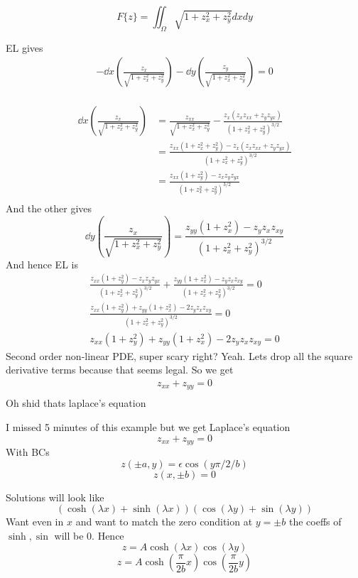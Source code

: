 \documentclass{X:/Documents/Coding/Latex/myassignment}
\begin{document}
\[F\{z\} = \iint_{\Omega} \sqrt{1+ z_x^2 + z_y^2} dxdy\]

EL gives
\begin{align*}
	- \dd{}x \left(\frac{z_x}{\sqrt{1 + z_x^2 + z_y^2}}\right) - \dd{}y \left(\frac{z_y}{\sqrt{1+z_x^2+z_y^2}}\right)=0\\
\end{align*}

\begin{align*}
	\dd{}x \left(\frac{z_x}{\sqrt{1+z_x^2+z_y^2}}\right) &= \frac{z_{xx}}{\sqrt{1+z_x^2+z_y^2}} - \frac{z_x(z_x z_{xx} + z_y z_{yx})}{(1 + z_x^2 + z_y^2)^{3/2}}\\
	&=\frac{z_{xx} (1+z_x^2 + z_y^2) - z_x(z_x z_{xx} + z_y z_{yx})}{(1 + z_x^2 + z_y^2)^{3/2}}\\
	&= \frac{z_{xx} (1+ z_y^2) - z_x z_y z_{yx}}{(1 + z_x^2 + z_y^2)^{3/2}}\\
\end{align*}
And the other gives
\[\dd{}y \left(\frac{z_x}{\sqrt{1+z_x^2+z_y^2}}\right) = \frac{z_{yy} (1+ z_x^2) - z_y z_x z_{xy}}{(1 + z_x^2 + z_y^2)^{3/2}}\]
And hence
EL is
\begin{align*}
	\frac{z_{xx} (1+ z_y^2) - z_x z_y z_{yx}}{(1 + z_x^2 + z_y^2)^{3/2}} + \frac{z_{yy} (1+ z_x^2) - z_y z_x z_{xy}}{(1 + z_x^2 + z_y^2)^{3/2}} = 0\\
	\frac{z_{xx} (1+ z_y^2) + z_{yy} (1+ z_x^2) - 2z_y z_x z_{xy}}{(1 + z_x^2 + z_y^2)^{3/2}} = 0\\
	z_{xx} (1+ z_y^2) + z_{yy} (1+ z_x^2) - 2z_y z_x z_{xy} = 0
\end{align*}
Second order non-linear PDE, super scary right? Yeah. Lets drop all the square derivative terms because that seems legal.
So we get
\begin{align*}
	z_{xx} + z_{yy} = 0\\
\end{align*}
Oh shid thats laplace's equation



I missed 5 minutes of this example but we get Laplace's equation 
\[z_{xx} + z_{yy} = 0\]
With BCs
\[z(\pm a,y ) = \epsilon \cos(y \pi/2 /b)\]
\[z(x,\pm b) = 0\]

Solutions will look like 
\[(\cosh(\lambda x) + \sinh (\lambda x) ) (\cos(\lambda y) + \sin(\lambda y))\]
Want even in $x$ and want to match the zero condition at $y = \pm b$ the coeffs of $\sinh,\sin$ will be $0$.
Hence
\[z = A \cosh(\lambda x) \cos(\lambda y)\]
\[z = A \cosh(\frac{\pi}{2b} x) \cos(\frac{\pi}{2b}  y)\]
\end{document}
